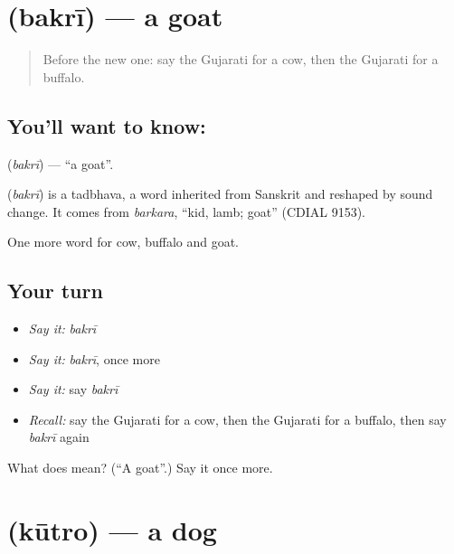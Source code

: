 \section[\texorpdfstring{\gu{બકરી} (bakrī)}{બકરી (bakrī)}]{ (bakrī) — a goat}

\label{lesson:GU-C67-goat}



\begin{quote}
Before the new one: say the Gujarati for a cow, then the Gujarati for a buffalo.
\end{quote}

\subsection*{You'll want to know: }
\textbf{} (\emph{bakrī}) — \textquotedblleft{}a goat\textquotedblright{}.

\begin{cousinweb}
\textbf{} (\emph{bakrī}) is a tadbhava, a word inherited from Sanskrit and reshaped by sound change. It comes from \emph{barkara}, \textquotedblleft{}kid, lamb; goat\textquotedblright{} (CDIAL 9153).
\end{cousinweb}

\begin{grammarlens}[title={What you've built}]
One more word for cow, buffalo and goat.
\end{grammarlens}

\subsection*{Your turn}
\begin{itemize}
\raggedright
  \item \emph{Say it:} \emph{bakrī}
  \item \emph{Say it:} \emph{bakrī}, once more
  \item \emph{Say it:} say \emph{bakrī}
  \item \emph{Recall:} say the Gujarati for a cow, then the Gujarati for a buffalo, then say \emph{bakrī} again
\end{itemize}

\begin{tcolorbox}[breakable,colback=teal!4,colframe=teal!35!black,title={Before you move on}]
What does  mean? (\textquotedblleft{}A goat\textquotedblright{}.) Say it once more.
\end{tcolorbox}
\section[\texorpdfstring{\gu{કૂતરો} (kūtro)}{કૂતરો (kūtro)}]{ (kūtro) — a dog}

